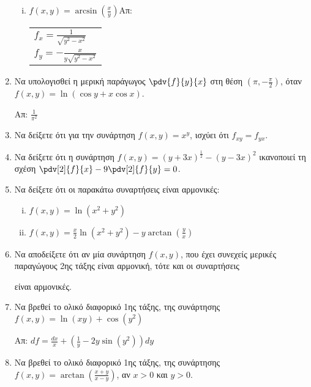 \begin{enumerate}
\begin{enumerate}[i)]
\item $f(x,y)=\arcsin(\frac{x}{y})$\hfill Απ: \begin{tabular}{l} $\scriptstyle{f_x=\frac{1}{\sqrt{y^2-x^2}}}$ \\ $\scriptstyle{f_y=-\frac{x}{y\sqrt{y^2-x^2}}}$\end{tabular}
\end{enumerate}

\item Να υπολογισθεί η μερική παράγωγος $\pdv{f}{y}{x}$ στη θέση $\left(\pi,-\frac{\pi}{2}\right)$, όταν $f(x,y)=\ln\left(\cos y+x\cos x\right)$.

\hfill Απ: $\scriptstyle{\frac{1}{\pi^2}}$

\item Να δείξετε ότι για την συνάρτηση $ f(x,y) = x^{y} $, ισχύει ότι $ f_{xy} = f_{yx} $.

\item Να δείξετε ότι η συνάρτηση $ f(x,y) = (y+3x)^{\frac{ 1 }{ 2 }} - (y-3x)^{2} $ ικανοποιεί τη
	σχέση $ \pdv[2]{f}{x} - 9 \pdv[2]{f}{y} = 0 $.

\item Να δείξετε ότι οι παρακάτω συναρτήσεις είναι αρμονικές:
	\begin{enumerate}[(i)]
		\item $f(x,y) = \ln(x^{2} + y^{2})$
		\item $ f(x,y) = \frac{ x }{ 2 } \ln(x^{2} + y^{2}) - y \arctan(\frac{ y }{ x } ) $
	\end{enumerate}

\item Να αποδείξετε ότι αν μία συνάρτηση $f(x,y)$, που έχει συνεχείς μερικές παραγώγους 2ης τάξης
	 είναι αρμονική, τότε και οι συναρτήσεις 
	 \begin{enumerate*}[i)]
	 \item $ f_{x} $ 
	 \item $ f_{y} $
	 \item $ xf_{x}+yf_{y} $
	 \item $ xf_{x}-yf_{y} $
	 \end{enumerate*}
	 είναι αρμονικές.

\item Να βρεθεί το ολικό διαφορικό 1ης τάξης, της συνάρτησης $f(x,y)=\ln(xy)+\cos(y^2)$

	\hfill Απ: $\scriptstyle{df=\frac{dx}{x}+\left(\frac{1}{y}-2y\sin(y^2)\right)dy}$

\item Να βρεθεί το ολικό διαφορικό 1ης τάξης, της συνάρτησης $ f(x,y) = \arctan(\frac{ x+y }{ x-y
	}) $, αν $ x>0 $ και $ y>0 $.


\end{enumerate}
